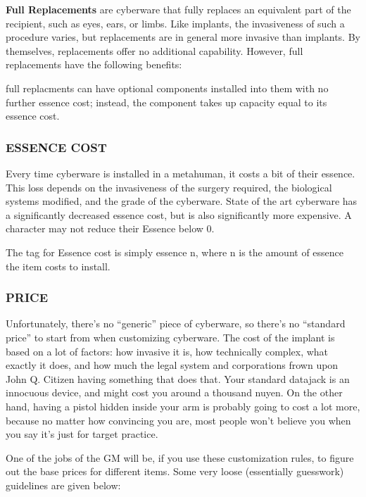 \documentclass[oneside,10pt]{article}
\begin{document}
\begin{multicols}{2}
\textbf{Full Replacements} are cyberware that fully replaces an
equivalent part of the recipient, such as eyes, ears, or limbs.
Like implants, the invasiveness of such a procedure varies,
but replacements are in general more invasive than implants.
By themselves, replacements offer no additional capability.
However, full replacements have the following benefits:

\begin{adjustwidth*}{.5cm}{.5cm}

\tcirc{} full replacments can have optional components installed
into them with no further essence cost; instead, the
component takes up capacity equal to its essence cost.
\end{adjustwidth*}
\subsubsection{ESSENCE COST}
Every time cyberware is installed in a metahuman, it costs a
bit of their essence. This loss depends on the invasiveness of
the surgery required, the biological systems modified, and
the grade of the cyberware. State of the art cyberware has a
significantly decreased essence cost, but is also significantly
more expensive. A character may not reduce their Essence
below 0.

The tag for Essence cost is simply essence n, where n is the
amount of essence the item costs to install.

\subsubsection{PRICE}
Unfortunately, there’s no “generic” piece of cyberware, so
there’s no “standard price” to start from when customizing
cyberware. The cost of the implant is based on a lot of factors:
how invasive it is, how technically complex, what exactly it
does, and how much the legal system and corporations frown
upon John Q. Citizen having something that does that. Your
standard datajack is an innocuous device, and might cost you
around a thousand nuyen. On the other hand, having a pistol
hidden inside your arm is probably going to cost a lot more,
because no matter how convincing you are, most people
won’t believe you when you say it’s just for target practice.

One of the jobs of the GM will be, if you use these customization rules, to figure out the base prices for different items.
Some very loose (essentially guesswork) guidelines are given
below:


\end{multicols}
\end{document}
